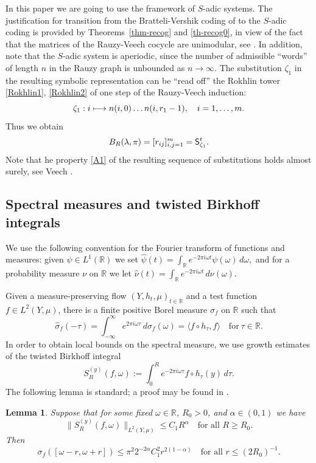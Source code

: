 \documentclass[JEP,XML,SOM,Unicode]{cedram}
\def\mto{\mathchoice{\longmapsto}{\mapsto}{\mapsto}{\mapsto}}
\newcommand{\sep}{:}
\theoremstyle{plain}
\newtheorem{lemma}[theorem]{Lemma}
\theoremstyle{definition}
\let\lam\lambda
\let\om\omega
\let\sig\sigma
\newcommand{\R}{\mathbb{R}}
\newcommand\Sf{{\sf S}}
\newcommand\be{\begin{equation}}
\newcommand\ee{\end{equation}}
\begin{document}
In this paper we are going to use the framework of $S$-adic systems. The justification for transition from the Bratteli-Vershik coding of \cite{Buf-umn} to the $S$-adic coding is provided by Theorems~\ref{thm-recog} and \ref{th-recog0}, in view of the fact that the matrices of the Rauzy-Veech cocycle are unimodular, see \cite{veech,veechamj}. In addition, note that the $S$-adic system is aperiodic, since the number of admissible ``words'' of length $n$ in the Rauzy graph is unbounded as $n\to \infty$.
The substitution $\zeta_1$ in the resulting symbolic representation can be ``read off'' the Rokhlin tower \eqref{Rokhlin1}, \eqref{Rokhlin2} of one step of the Rauzy-Veech induction:
\be \label{induc}
\zeta_1\sep i \mto n(i,0)\ldots n(i, r_1-1),\quad i=1,\ldots,m.
\ee
Thus we obtain
\[
B_R(\lam,\pi) = { [r_{ij}]_{i,j=1}^m} = \Sf_{\zeta_1}^t.\]
Note that he property \eqref{A1} of the resulting sequence of substitutions
holds almost surely, see Veech \cite{veech}.


\subsection{Spectral measures and twisted Birkhoff integrals} \label{sec-twist}
We use the following convention for the Fourier transform of functions and measures: given $\psi\in L^1(\R)$ we set
$
\widehat{\psi}(t) = \int_\R e^{-2\pi i \om t} \psi(\om)\,d\om,
$
and for a probability measure $\nu$ on $\R$ we let
$
\widehat{\nu}(t) = \int_\R e^{-2\pi i \om t}\,d\nu(\om).
$

Given a measure-preserving flow
$(Y, h_t,\mu)_{t\in \R}$ and a test function $f\in L^2(Y,\mu)$,
there is a finite positive Borel measure $\sig_f$ on $\R$ such that
\[
\widehat{\sig}_f(-\tau)=\int_{-\infty}^\infty e^{2 \pi i\om \tau}\,d\sig_f(\om) = \langle f\circ h_\tau, f\rangle\quad \text{for}\ \tau\in \R.
\]
In order to obtain local bounds on the spectral measure, we use growth estimates of the twisted Birkhoff integral
\be \label{twist1}
S_R^{(y)}(f,\om) := \int_0^R e^{-2\pi i \om \tau} f\circ h_\tau(y)\,d\tau.
\ee
The following lemma is standard; a proof may be found in \cite[Lem.\,4.3]{BuSol2}.

\begin{lemma} \label{lem-varr} Suppose that for some fixed $\om \in \R$, $R_0>0$, and $\alpha \in (0,1)$ we have
\be \label{L2est}
\bigl\|S_R^{(y)}(f,\om)\bigr\|_{L^2(Y,\mu)}\le C_1R^\alpha\quad \text{for all }R\ge R_0.
\ee
Then
\be \label{locest}
\sig_f([\om-r,\om+r]) \le \pi^2 2^{-2\alpha} C_1^2 r^{2(1-\alpha)}\quad \text{for all }r \le (2R_0)^{-1}.
\ee
\end{lemma}
\end{document}
